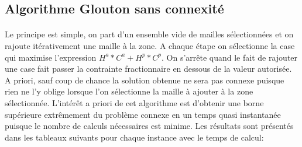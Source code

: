 \documentclass[a4paper, 11pt]{article} %
\begin{document}
\subsection{Algorithme Glouton sans connexité}

\paragraph*{}
Le principe est simple, on part d'un ensemble vide de mailles sélectionnées et on rajoute itérativement une maille à la zone. A chaque étape on sélectionne la case qui maximise l'expression $H^a*C^a+H^p*C^p$. On s'arrête quand le fait de rajouter une case fait passer la contrainte fractionnaire en dessous de la valeur autorisée. A priori, sauf coup de chance la solution obtenue ne sera pas connexe puisque rien ne l'y oblige lorsque l'on sélectionne la maille à ajouter à la zone sélectionnée. L'intérêt a priori de cet algorithme est d'obtenir une borne supérieure extrêmement du problème connexe en un temps quasi instantanée puisque le nombre de calculs nécessaires est minime. Les résultats sont présentés dans les tableaux suivants pour chaque instance avec le temps de calcul:
\end{document}
